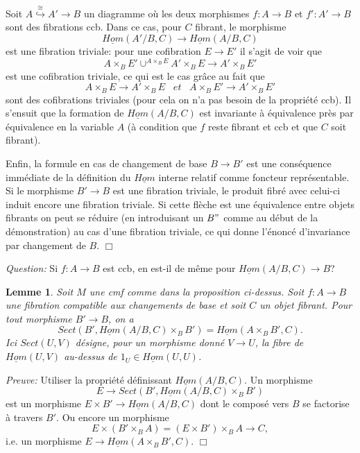 \documentclass[12pt]{article}
\newcommand{\eop}{\hfill $\Box$\vspace{.1in}}
\newtheorem{lemme}[lemma]{Lemme}
\begin{document}
Soit $A\stackrel{\cong}{\hookrightarrow}A'\rightarrow B$ un diagramme
o\`u les
deux morphismes $f:A\rightarrow B$ et $f':A'\rightarrow B$ sont des
fibrations
ccb. Dans ce cas, pour $C$ fibrant, le morphisme
$$
\underline{Hom}(A'/B,C)\rightarrow \underline{Hom}(A/B, C)
$$
est une fibration triviale: pour une cofibration $E\rightarrow E'$ il
s'agit de voir que
$$
A\times _B E'
\cup ^{A\times _BE} A'\times _B E \rightarrow A'\times _BE'
$$
est une cofibration triviale, ce qui est le cas gr\^ace au fait que
$$
A\times _BE\rightarrow A'\times _BE \;\;\; et \;\;\;
A\times _BE' \rightarrow A'\times _BE'
$$
sont des cofibrations triviales (pour cela on n'a pas besoin de la
propri\'et\'e
ccb). Il s'ensuit que la formation de $\underline{Hom}(A/B, C)$ est
invariante
\`a
\'equivalence pr\`es par \'equivalence en la variable $A$ (\`a condition que
$f$ reste fibrant et ccb et que $C$ soit fibrant).

Enfin, la formule en cas de changement de base $B\rightarrow B'$
est une cons\'equence imm\'ediate de la d\'efinition du $\underline{Hom}$
interne relatif
comme foncteur repr\'esentable. Si le morphisme $B'\rightarrow B$
est une fibration triviale,
le produit fibr\'e avec celui-ci induit encore une
fibration triviale. Si cette fl\`eche est une \'equivalence entre objets
fibrants on peut se r\'eduire (en introduisant un $B"$ comme au d\'ebut de la
d\'emonstration) au cas d'une fibration triviale, ce qui donne l'\'enonc\'e
d'invariance par changement de $B$.
\eop

{\em Question:} Si $f:A\rightarrow B$ est ccb, en est-il de m\^eme pour
$\underline{Hom}(A/B,C)\rightarrow B$?

\begin{lemme}
\label{propunivHominterne}
Soit $M$ une cmf comme dans la proposition ci-dessus. Soit $f:A\rightarrow B$
une fibration compatible aux changements de base et soit $C$ un objet fibrant.
Pour tout morphisme $B'\rightarrow B$, on a
$$
Sect (B', \underline{Hom}(A/B, C)\times _BB') =
\underline{Hom}(A\times _BB',C).
$$
Ici $Sect(U,V)$ d\'esigne,
pour un
morphisme donn\'e $V\rightarrow U$,
la fibre de
$\underline{Hom}(U,V)$ au-dessus de $1_U\in \underline{Hom}(U,U)$.
\end{lemme}
{\em Preuve:}
Utiliser la propri\'et\'e d\'efinissant $\underline{Hom}(A/B, C)$.
Un morphisme
$$
E\rightarrow Sect (B', \underline{Hom}(A/B, C)\times _BB')
$$
est un morphisme $E\times B'\rightarrow \underline{Hom}(A/B, C)$
dont le compos\'e vers $B$ se factorise \`a travers $B'$. Ou encore un
morphisme
$$
E\times (B'\times _BA)= (E\times B')\times _B A\rightarrow C,
$$
i.e. un morphisme $E\rightarrow \underline{Hom}(A\times _BB',C)$.
\eop
\end{document}
